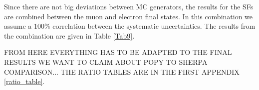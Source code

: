 Since there are not big deviations between MC generators, the results for the SFs are combined between the muon and electron final states. In this combination we assume a 100$\%$ correlation between the systematic uncertainties. The results from the combination are given in Table \ref{Tab9}.
\begin{table}[h]
\end{table} 
FROM HERE EVERYTHING HAS TO BE ADAPTED TO THE FINAL RESULTS WE WANT TO CLAIM ABOUT POPY TO SHERPA COMPARISON... THE RATIO TABLES ARE IN THE FIRST APPENDIX \ref{ratio_table}.

